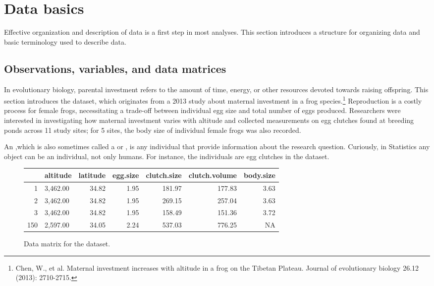 

\section{Data basics}
\label{dataBasics}

Effective organization and description of data is a first step in most analyses. This section introduces a structure for organizing data and basic terminology used to describe data.

\subsection{Observations, variables, and data matrices}
\label{frogDataExample}


In evolutionary biology, parental investment refers to the amount of time, energy, or other resources devoted towards raising offspring. This section introduces the  dataset, which originates from a 2013 study about maternal investment in a frog species.\footnote{Chen, W., et al. Maternal investment increases with altitude in a frog on the Tibetan Plateau. Journal of evolutionary biology 26.12 (2013): 2710-2715.} Reproduction is a costly process for female frogs, necessitating a trade-off between individual egg size and total number of eggs produced. Researchers were interested in investigating how maternal investment varies with altitude and collected measurements on egg clutches found at breeding ponds across 11 study sites; for 5 sites, the body size of individual female frogs was also recorded.

 An ,which  is also sometimes called a  or , is any  individual  that provide information about the research question. Curiously, in Statistics  any object can be an individual, not only humans. For instance, the individuals are  egg clutches in the  dataset. 

\begin{figure}[ht]
\centering
\begin{tabular}{rlrrrrr}
  \hline
 & altitude & latitude & egg.size & clutch.size & clutch.volume & body.size \\ 
  \hline
1 & 3,462.00 & 34.82 & 1.95 & 181.97 & 177.83 & 3.63 \\ 
  2 & 3,462.00 & 34.82 & 1.95 & 269.15 & 257.04 & 3.63 \\ 
  3 & 3,462.00 & 34.82 & 1.95 & 158.49 & 151.36 & 3.72 \\ 
  150 & 2,597.00 & 34.05 & 2.24 & 537.03 & 776.25 & NA \\ 
   \hline
\end{tabular}
\caption{Data matrix for the  dataset.} 
\label{frogDF}
\end{figure}

